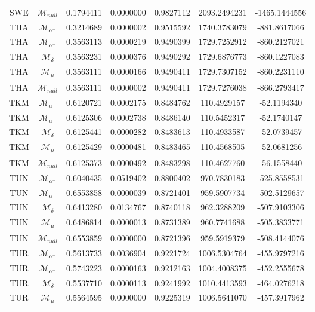 \begin{tabular}{ccccccc}
SWE & $\mathcal{M}_{null}$ & 0.1794411 & 0.0000000 & 0.9827112 & 2093.2494231 & -1465.1444556\\
THA & $\mathcal{M}_{\alpha^+}$ & 0.3214689 & 0.0000002 & 0.9515592 & 1740.3783079 & -881.8617066\\
THA & $\mathcal{M}_{\alpha^-}$ & 0.3563113 & 0.0000219 & 0.9490399 & 1729.7252912 & -860.2127021\\
THA & $\mathcal{M}_{\delta}$ & 0.3563231 & 0.0000376 & 0.9490292 & 1729.6876773 & -860.1227083\\
THA & $\mathcal{M}_{\mu}$ & 0.3563111 & 0.0000166 & 0.9490411 & 1729.7307152 & -860.2231110\\
THA & $\mathcal{M}_{null}$ & 0.3563111 & 0.0000002 & 0.9490411 & 1729.7276038 & -866.2793417\\
TKM & $\mathcal{M}_{\alpha^+}$ & 0.6120721 & 0.0002175 & 0.8484762 & 110.4929157 & -52.1194340\\
TKM & $\mathcal{M}_{\alpha^-}$ & 0.6125306 & 0.0002738 & 0.8486140 & 110.5452317 & -52.1740147\\
TKM & $\mathcal{M}_{\delta}$ & 0.6125441 & 0.0000282 & 0.8483613 & 110.4933587 & -52.0739457\\
TKM & $\mathcal{M}_{\mu}$ & 0.6125429 & 0.0000481 & 0.8483465 & 110.4568505 & -52.0681256\\
TKM & $\mathcal{M}_{null}$ & 0.6125373 & 0.0000492 & 0.8483298 & 110.4627760 & -56.1558440\\
TUN & $\mathcal{M}_{\alpha^+}$ & 0.6040435 & 0.0519402 & 0.8800402 & 970.7830183 & -525.8558531\\
TUN & $\mathcal{M}_{\alpha^-}$ & 0.6553858 & 0.0000039 & 0.8721401 & 959.5907734 & -502.5129657\\
TUN & $\mathcal{M}_{\delta}$ & 0.6413280 & 0.0134767 & 0.8740118 & 962.3288209 & -507.9103306\\
TUN & $\mathcal{M}_{\mu}$ & 0.6486814 & 0.0000013 & 0.8731389 & 960.7741688 & -505.3833771\\
TUN & $\mathcal{M}_{null}$ & 0.6553859 & 0.0000000 & 0.8721396 & 959.5919379 & -508.4144076\\
TUR & $\mathcal{M}_{\alpha^+}$ & 0.5613733 & 0.0036904 & 0.9221724 & 1006.5304764 & -455.9797216\\
TUR & $\mathcal{M}_{\alpha^-}$ & 0.5743223 & 0.0000163 & 0.9212163 & 1004.4008375 & -452.2555678\\
TUR & $\mathcal{M}_{\delta}$ & 0.5537710 & 0.0000113 & 0.9241992 & 1010.4413593 & -464.0276218\\
TUR & $\mathcal{M}_{\mu}$ & 0.5564595 & 0.0000000 & 0.9225319 & 1006.5641070 & -457.3917962\\

\end{tabular}
